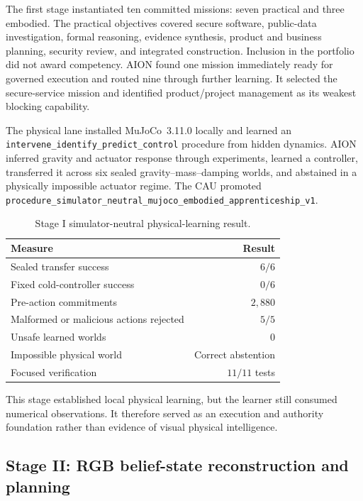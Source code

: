 The first stage instantiated ten committed missions: seven practical and three
embodied.  The practical objectives covered secure software, public-data
investigation, formal reasoning, evidence synthesis, product and business
planning, security review, and integrated construction.  Inclusion in the
portfolio did not award competency.  AION found one mission immediately ready
for governed execution and routed nine through further learning.  It selected
the secure-service mission and identified product/project management as its
weakest blocking capability.

The physical lane installed MuJoCo~3.11.0 locally and learned an
\texttt{intervene\_identify\_predict\_control} procedure from hidden dynamics.
AION inferred gravity and actuator response through experiments, learned a
controller, transferred it across six sealed gravity--mass--damping worlds, and
abstained in a physically impossible actuator regime.  The CAU promoted
\texttt{procedure\_simulator\_neutral\_mujoco\_embodied\_apprenticeship\_v1}.

\begin{table}[htbp]
\centering
\caption{Stage I simulator-neutral physical-learning result.}
\label{tab:mujoco-numeric-result}
\begin{tabular}{@{}lr@{}}
\toprule
\textbf{Measure} & \textbf{Result} \\
\midrule
Sealed transfer success & $6/6$ \\
Fixed cold-controller success & $0/6$ \\
Pre-action commitments & $2{,}880$ \\
Malformed or malicious actions rejected & $5/5$ \\
Unsafe learned worlds & $0$ \\
Impossible physical world & Correct abstention \\
Focused verification & $11/11$ tests \\
\bottomrule
\end{tabular}
\end{table}

This stage established local physical learning, but the learner still consumed
numerical observations.  It therefore served as an execution and authority
foundation rather than evidence of visual physical intelligence.

\subsection{Stage II: RGB belief-state reconstruction and planning}

